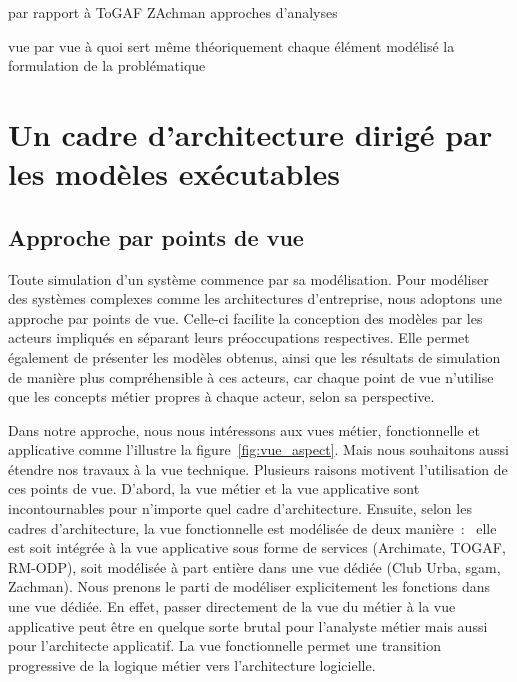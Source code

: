 par rapport à ToGAF
ZAchman
approches d'analyses

vue par vue à quoi sert même théoriquement
chaque élément modélisé la formulation de la problématique






\section{Un cadre d'architecture dirigé par les modèles exécutables}

\subsection{Approche par points de vue}

Toute simulation d'un système commence par sa modélisation. Pour modéliser des
systèmes complexes comme les architectures d'entreprise, nous adoptons une
approche par points de vue. Celle-ci facilite la conception des modèles par les
acteurs impliqués en séparant leurs préoccupations respectives. Elle permet
également de présenter les modèles obtenus, ainsi que les résultats de
simulation de manière plus compréhensible à ces acteurs, car chaque point de vue
n'utilise que les concepts métier propres à chaque acteur, selon sa perspective.

Dans notre approche, nous nous intéressons aux vues métier, fonctionnelle et
applicative comme l'illustre la figure~\ref{fig:vue_aspect}. Mais nous
souhaitons aussi étendre nos travaux à la vue technique. Plusieurs raisons
motivent l'utilisation de ces points de vue. D'abord, la vue métier et la vue
applicative sont incontournables pour n'importe quel cadre d'architecture.
Ensuite, selon les cadres d'architecture, la vue fonctionnelle est modélisée de
deux manière~:~ elle est soit intégrée à la vue applicative sous forme de
services (Archimate, TOGAF, RM-ODP), soit modélisée à part entière dans une vue
dédiée (Club Urba, \gls{sgam}, Zachman). Nous prenons le parti de modéliser
explicitement les fonctions dans une vue dédiée. En effet, passer directement
de la vue du métier à la vue applicative peut être en quelque sorte brutal pour
l'analyste métier mais aussi pour l'architecte applicatif. La vue fonctionnelle
permet une transition progressive de la logique métier vers l'architecture
logicielle.

